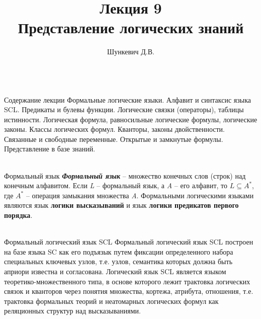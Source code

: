 \title{Лекция 9\\Представление логических знаний}
\author[]{Шункевич Д.В.}

\begin{frame}
	\titlepage
\end{frame}

\begin{frame}{\\Содержание лекции}
	\topline
	\justifying
	Формальные логические языки. Алфавит и синтаксис языка SCL. Предикаты и булевы функции. Логические связки (операторы), таблицы истинности. Логическая формула, равносильные логические формулы, логические законы. Классы логических формул. Кванторы, законы двойственности. Связанные и свободные переменные. Открытые и замкнутые формулы. Представление в базе знаний.
\end{frame}

\begin{frame}{\\Формальный язык}
	\topline
	\textbf{\textit{Формальный язык}} -- множество конечных слов (строк) над конечным алфавитом.
	\bigskip	
	Если \textit{L} -- формальный язык, а \textit{A} -- его алфавит, то $L \subseteq A^*$, где $A^*$ -- операция замыкания множества \textit{A}.
	\bigskip
	Формальными логическими языками являются язык \textbf{логики высказываний} и язык \textbf{логики предикатов первого порядка}.	
\end{frame}

\begin{frame}{\\Формальный логический язык SCL}
	\topline
	\justifying
	Формальный логический язык SCL построен на базе языка SC как его подъязык путем фиксации определенного набора специальных ключевых узлов, т.е. узлов, семантика которых должна быть априори
	известна и согласована.
	\bigskip
	Логический язык SCL является языком теоретико-множественного типа, в основе которого лежит трактовка логических связок и кванторов через понятия множества, кортежа, атрибута, отношения, т.е.
	трактовка формальных теорий и неатомарных логических формул как реляционных структур над высказываниями. 
\end{frame}


